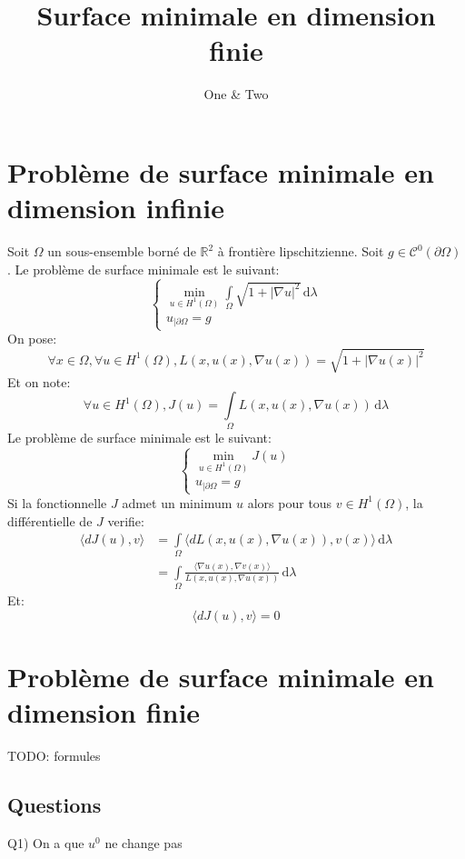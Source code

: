 \documentclass[a4paper, 11pt]{article}
\author{One \& Two}
\title{Surface minimale en dimension finie}
\begin{document}
\maketitle
\newpage

\section{Probl\`eme de surface minimale en dimension infinie}
Soit $\Omega$ un sous-ensemble born\'e de $\mathbb{R}^2$ \`a fronti\`ere
 lipschitzienne. Soit $g\in\mathcal{C}^0(\partial\Omega)$. Le probl\`eme de
 surface minimale est le suivant:
\begin{equation}
\begin{cases}
\min\limits_{u\in H^1(\Omega)}\int\limits_\Omega\sqrt{1+|\nabla u|^2}\,
\mathrm{d}\lambda \\
u_{|\partial\Omega}=g
\end{cases}
\end{equation}
On pose:
$$
\forall x\in\Omega, \forall u\in H^1(\Omega), L(x, u(x), \nabla u(x))=
\sqrt{1+|\nabla u(x)|^2}
$$
Et on note:
$$
\forall u\in H^1(\Omega), J(u)=\int\limits_\Omega L(x, u(x), \nabla u(x))
\,\mathrm{d}\lambda
$$
Le probl\`eme de surface minimale est le suivant:
\begin{equation}
\begin{cases}
\min\limits_{u\in H^1(\Omega)}J(u) \\
u_{|\partial\Omega}=g
\end{cases}
\end{equation}
Si la fonctionnelle $J$ admet un minimum $u$ alors pour tous $v\in H^1(\Omega)$,
 la diff\'erentielle de $J$ verifie:
\begin{align*}
\langle dJ(u), v\rangle &= \int\limits_\Omega\langle dL(x, u(x), \nabla u(x)),
v(x)\rangle\,\mathrm{d}\lambda \\
&= \int\limits_\Omega\frac{\langle \nabla u(x), \nabla v(x)\rangle}{L(x, u(x),
 \nabla u(x))}\,\mathrm{d}\lambda
\end{align*}
Et:
$$
\langle dJ(u), v\rangle = 0
$$
\newpage
\section{Probl\`eme de surface minimale en dimension finie}
TODO: formules
\subsection{Questions}
Q1) On a que $u^0$ ne change pas \\
\end{document}
